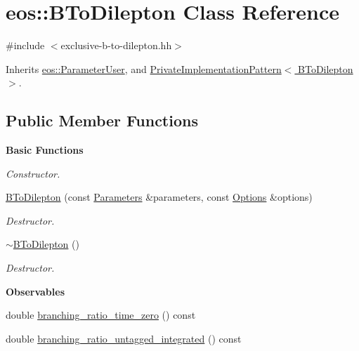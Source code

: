 \hypertarget{classeos_1_1BToDilepton}{
\section{eos::BToDilepton Class Reference}
\label{classeos_1_1BToDilepton}
}


{\ttfamily \#include $<$exclusive-\/b-\/to-\/dilepton.hh$>$}

Inherits \hyperlink{classeos_1_1ParameterUser}{eos::ParameterUser}, and \hyperlink{classeos_1_1PrivateImplementationPattern}{PrivateImplementationPattern$<$ BToDilepton $>$}.\subsection*{Public Member Functions}
\begin{Indent}{\bf Basic Functions}\par
{\em \label{_amgrp2386c9a1f1785edee33f374dd2db9b3d}
 Constructor. }\begin{DoxyCompactItemize}
\item 
\hyperlink{classeos_1_1BToDilepton_a4e95160c3e54cd1dcb87832c7ccdd15e}{BToDilepton} (const \hyperlink{classeos_1_1Parameters}{Parameters} \&parameters, const \hyperlink{classeos_1_1Options}{Options} \&options)
\begin{DoxyCompactList}\small\item\em Destructor. \item\end{DoxyCompactList}\item 
\hyperlink{classeos_1_1BToDilepton_a2a4cc57a5b21d062ecedc52215f03516}{$\sim$BToDilepton} ()
\begin{DoxyCompactList}\small\item\em Destructor. \item\end{DoxyCompactList}\end{DoxyCompactItemize}
\end{Indent}
\begin{Indent}{\bf Observables}\par
{\em \label{_amgrpfb400c1612336da8b8edb87235f67b77}
 }\begin{DoxyCompactItemize}
\item 
double \hyperlink{classeos_1_1BToDilepton_abd3e3629c6477f74ada275e2033035f1}{branching\_\-ratio\_\-time\_\-zero} () const 
\item 
double \hyperlink{classeos_1_1BToDilepton_afd43a14338c4bc5268b4b9c41ab14c7f}{branching\_\-ratio\_\-untagged\_\-integrated} () const 
\end{DoxyCompactItemize}
\end{Indent}


